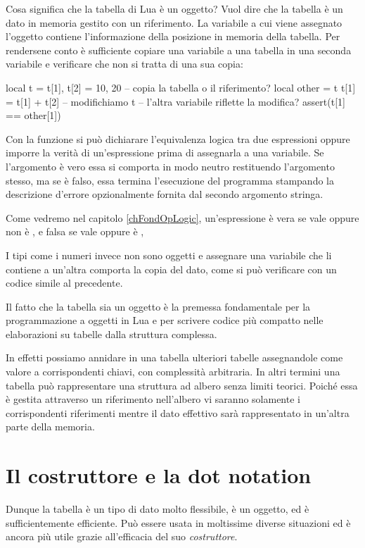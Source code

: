 Cosa significa che la tabella di Lua è un oggetto? Vuol dire che la tabella è un
dato in memoria gestito con un riferimento. La variabile a cui viene assegnato
l'oggetto contiene l'informazione della posizione in memoria della tabella. Per
rendersene conto è sufficiente copiare una variabile a una tabella in una
seconda variabile e verificare che non si tratta di una sua copia:
\begin{lines}
local t = {}
t[1], t[2] = 10, 20
-- copia la tabella o il riferimento?
local other = t
t[1] = t[1] + t[2] -- modifichiamo t
-- l'altra variabile riflette la modifica?
assert(t[1] == other[1])
\end{lines}

Con la funzione  si può dichiarare l'equivalenza
logica tra due espressioni oppure imporre la verità di un'espressione prima di
assegnarla a una variabile. Se l'argomento è vero essa si comporta in modo
neutro restituendo l'argomento stesso, ma se è falso, essa termina l'esecuzione
del programma stampando la descrizione d'errore opzionalmente fornita dal
secondo argomento stringa.

Come vedremo nel capitolo \ref{chFondOpLogic}, un'espressione è vera se vale
 oppure non è , e falsa se vale  oppure è
,

I tipi come i numeri invece non sono oggetti e assegnare una variabile che li
contiene a un'altra comporta la copia del dato, come si può verificare con un
codice simile al precedente.

Il fatto che la tabella sia un oggetto è la premessa fondamentale per la
programmazione a oggetti in Lua e per scrivere codice più compatto nelle
elaborazioni su tabelle dalla struttura complessa.

In effetti possiamo annidare in una tabella ulteriori tabelle assegnandole come
valore a corrispondenti chiavi, con complessità arbitraria. In altri termini una
tabella può rappresentare una struttura ad albero senza limiti teorici. Poiché
essa è gestita attraverso un riferimento nell'albero vi saranno solamente i
corrispondenti riferimenti mentre il dato effettivo sarà rappresentato in
un'altra parte della memoria.


\section{Il costruttore e la dot notation}

Dunque la tabella è un tipo di dato molto flessibile, è un oggetto, ed è
sufficientemente efficiente. Può essere usata in moltissime diverse situazioni
ed è ancora più utile grazie all'efficacia del suo \emph{costruttore}.

